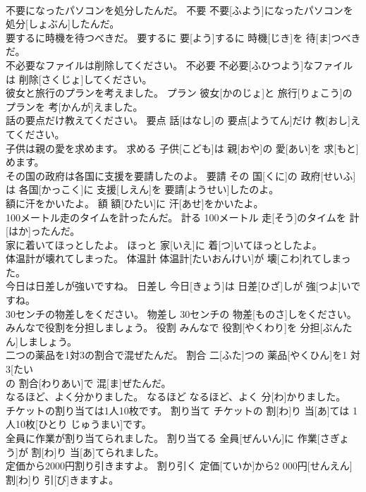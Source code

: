 \documentclass[8pt]{extreport}
\begin{document}
\begin{CJK}{UTF8}{min}
\\	不要になったパソコンを処分したんだ。	不要	不要[ふよう]になったパソコンを 処分[しょぶん]したんだ。	
\\	要するに時機を待つべきだ。	要するに	要[よう]するに 時機[じき]を 待[ま]つべきだ。	
\\	不必要なファイルは削除してください。	不必要	不必要[ふひつよう]なファイルは 削除[さくじょ]してください。	
\\	彼女と旅行のプランを考えました。	プラン	彼女[かのじょ]と 旅行[りょこう]のプランを 考[かんが]えました。	
\\	話の要点だけ教えてください。	要点	話[はなし]の 要点[ようてん]だけ 教[おし]えてください。	
\\	子供は親の愛を求めます。	求める	子供[こども]は 親[おや]の 愛[あい]を 求[もと]めます。	
\\	その国の政府は各国に支援を要請したのよ。	要請	その 国[くに]の 政府[せいふ]は 各国[かっこく]に 支援[しえん]を 要請[ようせい]したのよ。	
\\	額に汗をかいたよ。	額	額[ひたい]に 汗[あせ]をかいたよ。	
\\	100メートル走のタイムを計ったんだ。	計る	100メートル 走[そう]のタイムを 計[はか]ったんだ。	
\\	家に着いてほっとしたよ。	ほっと	家[いえ]に 着[つ]いてほっとしたよ。	
\\	体温計が壊れてしまった。	体温計	体温計[たいおんけい]が 壊[こわ]れてしまった。	
\\	今日は日差しが強いですね。	日差し	今日[きょう]は 日差[ひざ]しが 強[つよ]いですね。	
\\	30センチの物差しをください。	物差し	30センチの 物差[ものさ]しをください。	
\\	みんなで役割を分担しましょう。	役割	みんなで 役割[やくわり]を 分担[ぶんたん]しましょう。	
\\	二つの薬品を1対3の割合で混ぜたんだ。	割合	二[ふた]つの 薬品[やくひん]を1 対3[たい 
\\	の 割合[わりあい]で 混[ま]ぜたんだ。	
\\	なるほど、よく分かりました。	なるほど	なるほど、よく 分[わ]かりました。	
\\	チケットの割り当ては1人10枚です。	割り当て	チケットの 割[わ]り 当[あ]ては 1人10枚[ひとり じゅうまい]です。	
\\	全員に作業が割り当てられました。	割り当てる	全員[ぜんいん]に 作業[さぎょう]が 割[わ]り 当[あ]てられました。	
\\	定価から2000円割り引きますよ。	割り引く	定価[ていか]から2 000円[せんえん] 割[わ]り 引[び]きますよ。	

\end{CJK}
\end{document}

